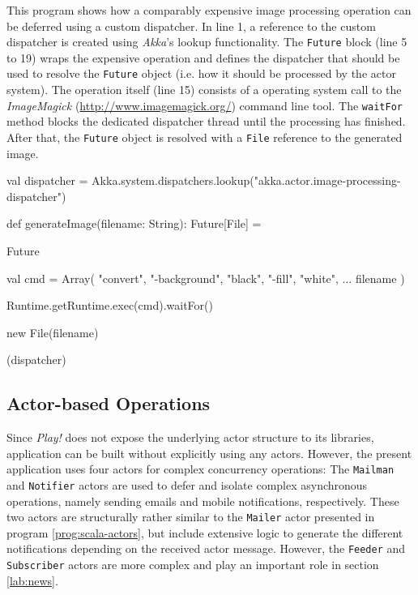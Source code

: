 \begin{program}
  \caption{This program shows how a comparably expensive image processing operation can be deferred using a custom dispatcher. In line 1, a reference to the custom dispatcher is created using \textit{Akka}'s lookup functionality. The \texttt{Future} block (line 5 to 19) wraps the expensive operation and defines the dispatcher that should be used to resolve the \texttt{Future} object (i.e. how it should be processed by the actor system). The operation itself (line 15) consists of a operating system call to the \textit{ImageMagick} (\url{http://www.imagemagick.org/}) command line tool. The \texttt{waitFor} method blocks the dedicated dispatcher thread until the processing has finished. After that, the \texttt{Future} object is resolved with a \texttt{File} reference to the generated image.}
  \label{prog:convert}
  \begin{JavaCode}
val dispatcher = Akka.system.dispatchers.lookup("akka.actor.image-processing-dispatcher")

def generateImage(filename: String): Future[File] = {

    Future {

        val cmd = Array(
            "convert",
            "-background", "black",
            "-fill", "white",
            ...
            filename
        )

        Runtime.getRuntime.exec(cmd).waitFor()

        new File(filename)
    
    } (dispatcher)
    
}
  \end{JavaCode}
\end{program}


\subsection{Actor-based Operations}
\label{lab:explicit-actors}
Since \textit{Play!} does not expose the underlying actor structure to its libraries, application can be built without explicitly using any actors. However, the present application uses four actors for complex concurrency operations: The \texttt{Mailman} and \texttt{Notifier} actors are used to defer and isolate complex asynchronous operations, namely sending emails and mobile notifications, respectively. These two actors are structurally rather similar to the \texttt{Mailer} actor presented in program \ref{prog:scala-actors}, but include extensive logic to generate the different notifications depending on the received actor message. However, the \texttt{Feeder} and \texttt{Subscriber} actors are more complex and play an important role in section \ref{lab:news}.

